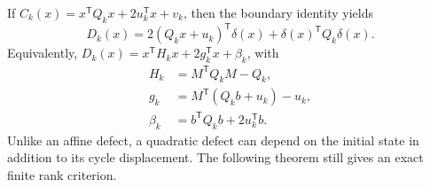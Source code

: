 \documentclass[11pt,a4paper]{article}
\theoremstyle{definition}\newtheorem{definition}[theorem]{Definition}\newtheorem{example}[theorem]{Example}\newtheorem{remark}[theorem]{Remark}
\begin{document}
If $C_k(x)=x^{\mathsf T}Q_kx+2u_k^{\mathsf T}x+v_k$, then the boundary
identity yields
\begin{equation}\label{eq:quadraticboundary}
 D_k(x)=2(Q_kx+u_k)^{\mathsf T}\delta(x)
                    +\delta(x)^{\mathsf T}Q_k\delta(x).
\end{equation}
Equivalently, $D_k(x)=x^{\mathsf T}H_kx+2g_k^{\mathsf T}x+\beta_k$, with
\begin{equation}\label{eq:quadraticcoeff}
 \begin{aligned}
 H_k&=M^{\mathsf T}Q_kM-Q_k,\\
 g_k&=M^{\mathsf T}(Q_kb+u_k)-u_k,\\
 \beta_k&=b^{\mathsf T}Q_kb+2u_k^{\mathsf T}b.
 \end{aligned}
\end{equation}
Unlike an affine defect, a quadratic defect can depend on the initial
state in addition to its cycle displacement. The following theorem
still gives an exact finite rank criterion.
\end{document}
